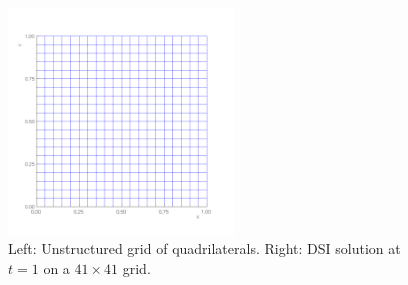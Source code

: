 \documentclass[10pt]{article}
\newcommand{\maxDoc}{\homeHenshaw/res/maxwell/doc}
\begin{document}
{
\newcommand{\figWidtha}{6cm}
\begin{figure}
\begin{center}
\includegraphics[width=\figWidtha]{figures/sqquadGrid}
\end{center}
\caption{Left: Unstructured grid of quadrilaterals. Right: DSI solution at $t=1$ on a $41\times 41$ grid.}
\end{figure}
}
\end{document}
